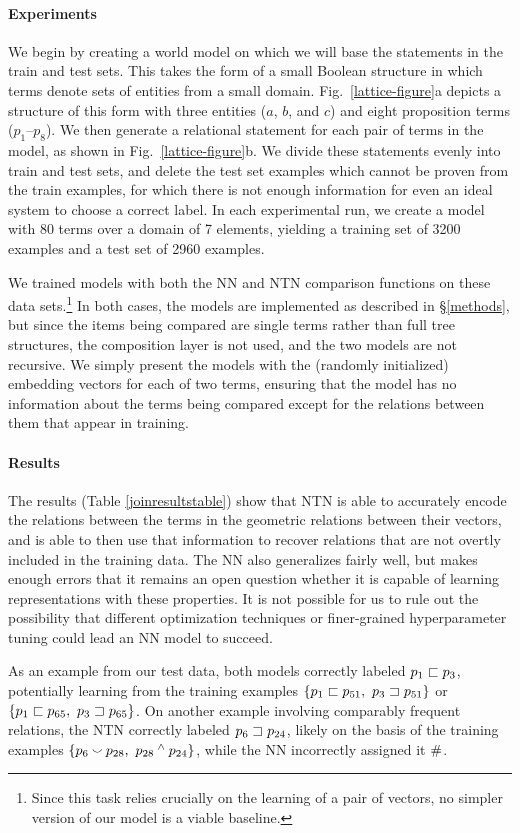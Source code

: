 \paragraph{Experiments}
We begin by creating a world model
on which we will base the statements in the train and test sets.
This takes the form of a small Boolean structure in which terms denote
sets of entities from a small domain.  Fig.~\ref{lattice-figure}a
depicts a structure of this form with three entities ($a$, $b$, and $c$) and eight proposition terms ($p_1$--$p_8$). We then generate a 
relational statement for each pair of terms in the model, as shown in Fig.~\ref{lattice-figure}b. 
We divide these statements evenly into train and test sets, and delete the test set
 examples which cannot be proven from the train examples, for which there is not enough information for even an ideal system to choose a correct label.
In each experimental run, we create a model with 80 terms over a domain of 7 elements, yielding a training set of 3200 examples and a test set of 
2960 examples.

We trained models with both the NN and NTN comparison functions on these
data sets.\footnote{Since this task relies crucially on the learning of a pair of vectors, no simpler version of our model is a viable baseline.} %
In both cases, the models are implemented as
described in \S\ref{methods}, but since the items being compared
are single terms rather than full tree structures, the composition
layer is not used, and the two models are not recursive. We simply present
the models with the (randomly initialized) embedding vectors for each
of two terms, ensuring that the model has no information about the terms
being compared except for the relations between them that appear in training.


\paragraph{Results} 
The results (Table \ref{joinresultstable}) show that NTN is able to accurately encode the relations between the terms in the geometric relations between their vectors, 
and is able to then use that information to recover relations that 
are not overtly included in the training data. The NN also generalizes fairly well, 
but makes enough errors that it remains an open question whether 
it is capable of learning representations with these properties. 
It is not possible for us to rule out the possibility that different optimization techniques or
finer-grained hyperparameter tuning could lead an NN model to succeed.

As an example from our test data, both models correctly labeled $p_1 \sqsubset p_3$, potentially learning from the training examples $\{p_1 \sqsubset p_{51},~p_3 \sqsupset p_{51}\}$ or $\{p_1\sqsubset p_{65},~p_3 \sqsupset p_{65} \}$. On another example involving comparably frequent relations, the NTN correctly labeled $p_6 \sqsupset p_{24}$, likely on the basis of the training examples $\{p_6 \mathbin{\smallsmile} p_{28},~p_{28} \mathbin{^{\wedge}} p_{24}\}$, while the NN incorrectly assigned it $\mathbin{\#}$.

